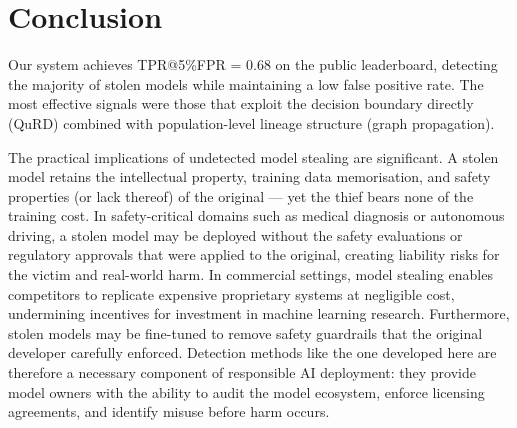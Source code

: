 \documentclass{article} %
\begin{document}
\section{Conclusion}

Our system achieves TPR@5\%FPR = 0.68 on the public leaderboard, detecting the majority of stolen models while maintaining a low false positive rate. The most effective signals were those that exploit the decision boundary directly (QuRD) combined with population-level lineage structure (graph propagation).

The practical implications of undetected model stealing are significant. A stolen model retains the intellectual property, training data memorisation, and safety properties (or lack thereof) of the original — yet the thief bears none of the training cost. In safety-critical domains such as medical diagnosis or autonomous driving, a stolen model may be deployed without the safety evaluations or regulatory approvals that were applied to the original, creating liability risks for the victim and real-world harm. In commercial settings, model stealing enables competitors to replicate expensive proprietary systems at negligible cost, undermining incentives for investment in machine learning research. Furthermore, stolen models may be fine-tuned to remove safety guardrails that the original developer carefully enforced. Detection methods like the one developed here are therefore a necessary component of responsible AI deployment: they provide model owners with the ability to audit the model ecosystem, enforce licensing agreements, and identify misuse before harm occurs.



\end{document}
